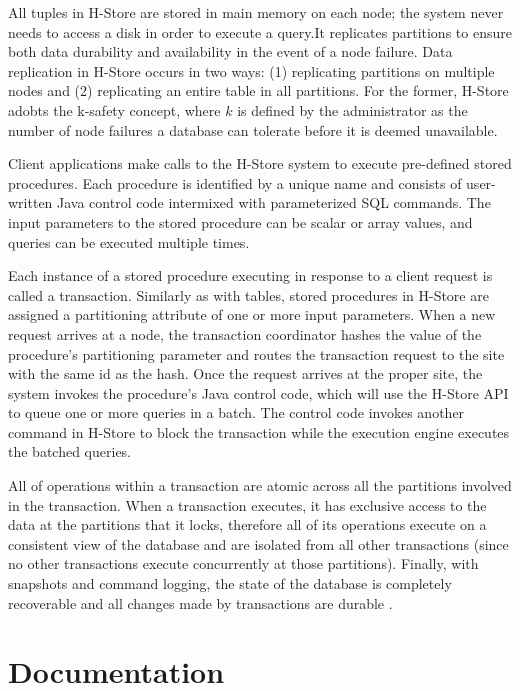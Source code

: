 \documentclass[9pt,twocolumn,twoside]{styles/osajnl}
\begin{document}
All tuples in H-Store are stored in main memory on each node; the system never needs to access a disk in order to execute a query.It replicates partitions to ensure both data durability and availability in the event of a node failure. Data replication in H-Store occurs in two ways: (1) replicating partitions on multiple nodes and (2) replicating an entire table in all partitions. For the former, H-Store adobts the k-safety concept, where $k$ is defined by the administrator as the number of node failures a database can tolerate before it is deemed unavailable.

Client applications make calls to the H-Store system to execute pre-defined stored procedures. Each procedure is identified by a unique name and consists of user-written Java control code intermixed with parameterized SQL commands. The input parameters to the stored procedure can be scalar or array values, and queries can be executed multiple times.

Each instance of a stored procedure executing in response to a client request is called a transaction. Similarly as with tables, stored procedures in H-Store are assigned a partitioning attribute of one or more input parameters. When a new request arrives at a node, the transaction coordinator hashes the value of the procedure’s partitioning parameter and routes the transaction request to the site with the same id as the hash. Once the request arrives at the proper site, the system invokes the procedure’s Java control code, which will use the H-Store API to queue one or more queries in a batch. The control code invokes another command in H-Store to block the transaction while the execution engine executes the batched queries.

All of operations within a transaction are atomic across all the partitions involved in the transaction. When a transaction executes, it has exclusive access to the data at the partitions that it locks, therefore all of its operations execute on a consistent view of the database and are isolated from all other transactions (since no other transactions execute concurrently at those partitions). Finally, with snapshots and command logging, the state of the database is completely recoverable and all changes made by transactions are durable \cite{kallman2008} \cite{www-H-StoreArch}.

\section{Documentation}
\end{document}

